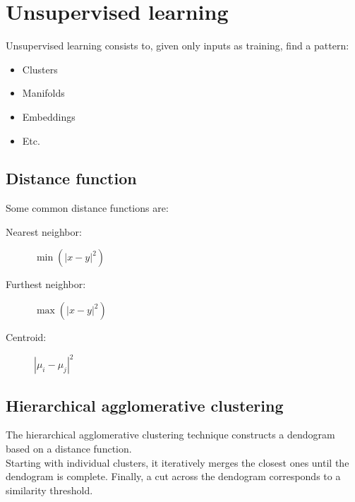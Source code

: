 \documentclass[11pt]{article}
\begin{document}
\section{Unsupervised learning}
\label{sec:orga51327d}
Unsupervised learning consists to, given only inputs as training, find a pattern:
\begin{itemize}[itemsep=0pt]
\item Clusters
\item Manifolds
\item Embeddings
\item Etc.
\end{itemize}
\subsection{Distance function}
\label{sec:org0c57f76}
Some common distance functions are:
\begin{description}
\item[{Nearest neighbor:}] \(\min({|x - y|}^2)\)
\item[{Furthest neighbor:}] \(\max({|x - y|}^2)\)
\item[{Centroid:}] \({|\mu_i - \mu_j|}^2\)
\end{description}
\subsection{Hierarchical agglomerative clustering}
\label{sec:orgf34231b}
The hierarchical agglomerative clustering technique constructs a dendogram based on a
distance function. \\
Starting with individual clusters, it iteratively merges the closest ones until the
dendogram is complete. Finally, a cut across the dendogram corresponds to a similarity
threshold.
\end{document}
